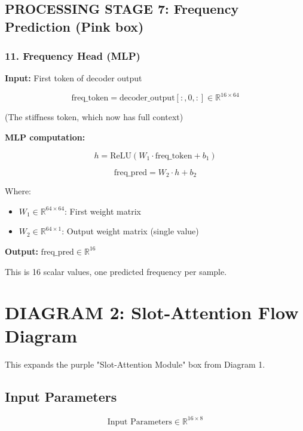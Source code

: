 \documentclass[11pt,a4paper]{article}
\begin{document}
\subsection{PROCESSING STAGE 7: Frequency Prediction (Pink box)}

\subsubsection{11. Frequency Head (MLP)}

\textbf{Input:} First token of decoder output

\begin{equation}
\text{freq\_token} = \text{decoder\_output}[:, 0, :] \in \mathbb{R}^{16 \times 64}
\end{equation}

(The stiffness token, which now has full context)

\textbf{MLP computation:}

\begin{equation}
h = \text{ReLU}(W_1 \cdot \text{freq\_token} + b_1)
\end{equation}

\begin{equation}
\text{freq\_pred} = W_2 \cdot h + b_2
\end{equation}

Where:
\begin{itemize}
  \item $W_1 \in \mathbb{R}^{64 \times 64}$: First weight matrix
  \item $W_2 \in \mathbb{R}^{64 \times 1}$: Output weight matrix (single value)
\end{itemize}

\textbf{Output:} $\text{freq\_pred} \in \mathbb{R}^{16}$

This is 16 scalar values, one predicted frequency per sample.

\section{DIAGRAM 2: Slot-Attention Flow Diagram}

This expands the purple "Slot-Attention Module" box from Diagram 1.

\subsection{Input Parameters}

\begin{equation}
\text{Input Parameters} \in \mathbb{R}^{16 \times 8}
\end{equation}
\end{document}
